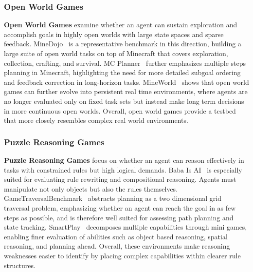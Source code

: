 \subsubsection{Open World Games} 
\label{Open World Games}
\textbf{Open World Games} examine whether an agent can sustain exploration and accomplish goals in highly open worlds with large state spaces and sparse feedback. MineDojo~\cite{MineDojo} is a representative benchmark in this direction, building a large suite of open world tasks on top of Minecraft that covers exploration, collection, crafting, and survival. 
MC Planner~\cite{MC-Planner} further emphasizes multiple steps planning in Minecraft, highlighting the need for more detailed subgoal ordering and feedback correction in long-horizon tasks. MineWorld~\cite{MINEWORLD} shows that open world games can further evolve into persistent real time environments, where agents are no longer evaluated only on fixed task sets but instead make long term decisions in more continuous open worlds. Overall, open world games provide a testbed that more closely resembles complex real world environments.


\subsubsection{Puzzle Reasoning Games}
\label{Puzzle Reasoning Games}
\textbf{Puzzle Reasoning Games} focus on whether an agent can reason effectively in tasks with constrained rules but high logical demands.
Baba Is AI~\cite{BabaIsAI} is especially suited for evaluating rule rewriting and compositional reasoning. Agents must manipulate not only objects but also the rules themselves. GameTraversalBenchmark~\cite{GameTraversalBenchmark} abstracts planning as a two dimensional grid traversal problem, emphasizing whether an agent can reach the goal in as few steps as possible, and is therefore well suited for assessing path planning and state tracking. 
SmartPlay~\cite{SMARTPLAY} decomposes multiple capabilities through mini games, enabling finer evaluation of abilities such as object based reasoning, spatial reasoning, and planning ahead. Overall, these environments make reasoning weaknesses easier to identify by placing complex capabilities within clearer rule structures.


